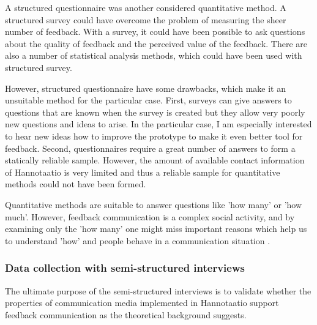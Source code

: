 \documentclass[english,12pt,a4paper,pdftex]{article}
\begin{document}
A structured questionnaire was another considered quantitative method. A structured survey could have overcome the problem of measuring the sheer number of feedback. With a survey, it could have been possible to ask questions about the quality of feedback and the perceived value of the feedback. There are also a number of statistical analysis methods, which could have been used with structured survey.

However, structured questionnaire have some drawbacks, which make it an unsuitable method for the particular case. First, surveys can give answers to questions that are known when the survey is created but they allow very poorly new questions and ideas to arise. In the particular case, I am especially interested to hear new ideas how to improve the prototype to make it even better tool for feedback. Second, questionnaires require a great number of answers to form a statically reliable sample. However, the amount of available contact information of Hannotaatio is very limited and thus a reliable sample for quantitative methods could not have been formed.

Quantitative methods are suitable to answer questions like 'how many' or 'how much'. However, feedback communication is a complex social activity, and by examining only the 'how many' one might miss important reasons which help us to understand 'how' and people behave in a communication situation \citep{silverman2009}.

\subsubsection{Data collection with semi-structured interviews}

The ultimate purpose of the semi-structured interviews is to validate whether the properties of communication media implemented in Hannotaatio support feedback communication as the theoretical background suggests. 

\end{document}
